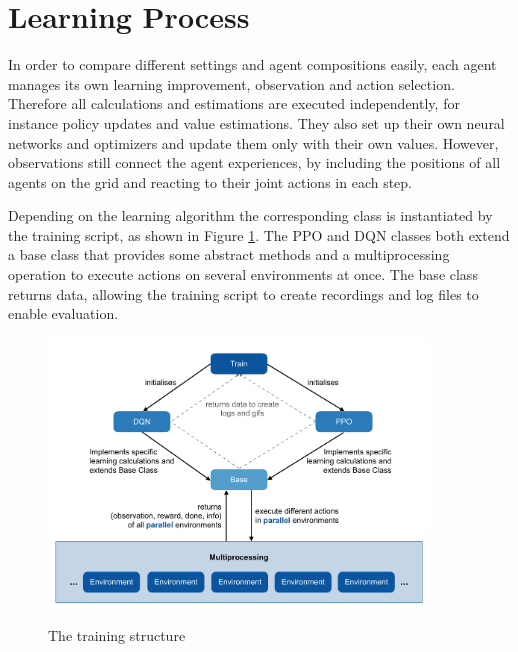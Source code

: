 \section{Learning Process}\label{learning_process}
In order to compare different settings and agent compositions easily, each agent manages its own learning improvement, observation and action selection. Therefore all calculations and estimations are executed independently, for instance policy updates and value estimations. They also set up their own neural networks and optimizers and update them only with their own values. However, observations still connect the agent experiences, by including the positions of all agents on the grid and reacting to their joint actions in each step.

Depending on the learning algorithm the corresponding class is instantiated by the training script, as shown in Figure \ref{fig:training}. The PPO and DQN classes both extend a base class that provides some abstract methods and a multiprocessing operation to execute actions on several environments at once. The base class returns data, allowing the training script to create recordings and log files to enable evaluation.

\begin{figure}[hpbt]
    \centering
    \includegraphics[width=0.9\textwidth]{pictures/training}\\
    \caption[The Training Structure]{The training structure}\label{fig:training}
\end{figure}

